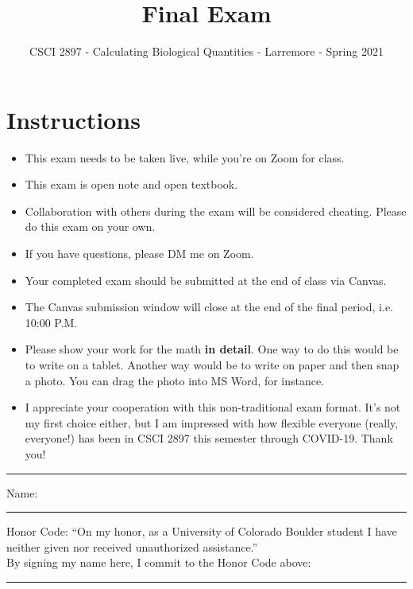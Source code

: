 \documentclass[11pt,onecolumn,superscriptaddress,notitlepage]{article}
\date{}
\newcounter{choice}
\begin{document}
\author{CSCI 2897 - Calculating Biological Quantities - Larremore - Spring 2021}
\title{Final Exam}
\maketitle


\section*{Instructions}
\begin{itemize}
	\item	This exam needs to be taken live, while you're on Zoom for class.
	\item This exam is open note and open textbook. 
	\item Collaboration with others during the exam will be considered cheating. Please do this exam on your own.
	\item If you have questions, please DM me on Zoom.
	\item Your completed exam should be submitted at the end of class via Canvas.
	\item The Canvas submission window will close at the end of the final period, i.e. 10:00 P.M. 
	\item Please show your work for the math {\bf in detail}. One way to do this would be to write on a tablet. Another way would be to write on paper and then snap a photo. You can drag the photo into MS Word, for instance. 
	\item I appreciate your cooperation with this non-traditional exam format. It's not my first choice either, but I am impressed with how flexible everyone (really, everyone!) has been in CSCI 2897 this semester through COVID-19. Thank you!
\end{itemize}

\vspace{1in}

\hrule \vspace{0.15in}
Name:\\ 

\hrule \vspace{0.15in}
Honor Code: ``On my honor, as a University of Colorado Boulder student I have neither given nor received unauthorized assistance.''\\

By signing my name here, I commit to the Honor  Code above: 
\\ \hrule
\end{document}
